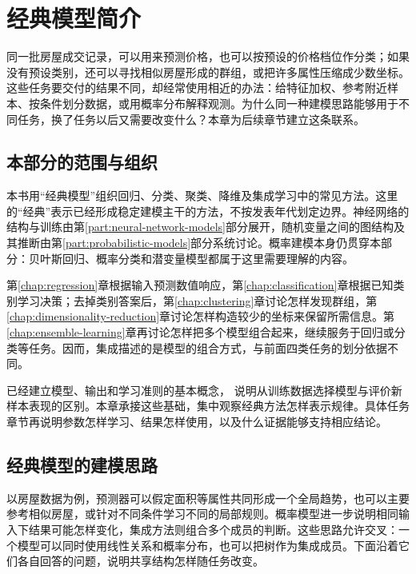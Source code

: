 \chapter{经典模型简介}
\label{chap:classic-models-overview}

同一批房屋成交记录，可以用来预测价格，也可以按预设的价格档位作分类；如果没有预设类别，还可以寻找相似房屋形成的群组，或把许多属性压缩成少数坐标。这些任务要交付的结果不同，却经常使用相近的办法：给特征加权、参考附近样本、按条件划分数据，或用概率分布解释观测。为什么同一种建模思路能够用于不同任务，换了任务以后又需要改变什么？本章为后续章节建立这条联系。

\section{本部分的范围与组织}
\label{sec:classic-overview-scope}

本书用“经典模型”组织回归、分类、聚类、降维及集成学习中的常见方法。这里的“经典”表示已经形成稳定建模主干的方法，不按发表年代划定边界。神经网络的结构与训练由第\ref{part:neural-network-models}部分展开，随机变量之间的图结构及其推断由第\ref{part:probabilistic-models}部分系统讨论。概率建模本身仍贯穿本部分：贝叶斯回归、概率分类和潜变量模型都属于这里需要理解的内容。

第\ref{chap:regression}章根据输入预测数值响应，第\ref{chap:classification}章根据已知类别学习决策；去掉类别答案后，第\ref{chap:clustering}章讨论怎样发现群组，第\ref{chap:dimensionality-reduction}章讨论怎样构造较少的坐标来保留所需信息。第\ref{chap:ensemble-learning}章再讨论怎样把多个模型组合起来，继续服务于回归或分类等任务。因而，集成描述的是模型的组合方式，与前面四类任务的划分依据不同。

已经建立模型、输出和学习准则的基本概念，
说明从训练数据选择模型与评价新样本表现的区别。本章承接这些基础，集中观察经典方法怎样表示规律。具体任务章节再说明参数怎样学习、结果怎样使用，以及什么证据能够支持相应结论。

\section{经典模型的建模思路}
\label{sec:classic-overview-modeling}

以房屋数据为例，预测器可以假定面积等属性共同形成一个全局趋势，也可以主要参考相似房屋，或针对不同条件学习不同的局部规则。概率模型进一步说明相同输入下结果可能怎样变化，集成方法则组合多个成员的判断。这些思路允许交叉：一个模型可以同时使用线性关系和概率分布，也可以把树作为集成成员。下面沿着它们各自回答的问题，说明共享结构怎样随任务改变。

